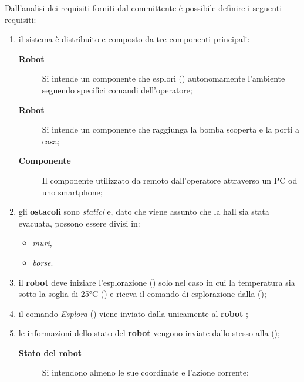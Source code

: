 
Dall'analisi dei requisiti forniti dal committente è possibile definire i seguenti requisiti:

\begin{enumerate}
  \item
    il sistema è distribuito e composto da tre componenti principali:
    \begin{description}
      \item[\textbf{Robot }] Si intende un componente che esplori () autonomamente l'ambiente seguendo specifici comandi dell'operatore;
      \item[\textbf{Robot }] Si intende un componente che raggiunga la bomba scoperta e la porti a casa;
      \item[\textbf{Componente }] Il componente utilizzato da remoto dall'operatore attraverso un PC od uno smartphone;
    \end{description}

  \item
    gli \textbf{ostacoli} sono \textit{statici} e, dato che viene assunto che la hall sia stata evacuata, possono essere divisi in:
    \begin{itemize}
      \item \textit{muri},
      \item \textit{borse}.
    \end{itemize}

  \item
    il \textbf{robot } deve iniziare l'esplorazione () solo nel caso in cui la temperatura sia sotto la soglia di 25°C () e riceva il comando di esplorazione dalla \textbf{} ();

  \item
    il comando \textit{Esplora} () viene inviato dalla \textbf{} unicamente al \textbf{robot };

  \item
    le informazioni dello stato del \textbf{robot } vengono inviate dallo stesso alla \textbf{} ();
    \begin{description}
      \item[\textbf{Stato del robot}] Si intendono almeno le sue coordinate e l'azione corrente;
    \end{description}


\end{enumerate}
